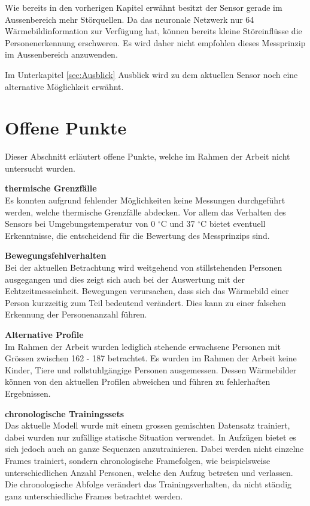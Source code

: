 Wie bereits in den vorherigen Kapitel erwähnt besitzt der Sensor gerade im Aussenbereich mehr Störquellen. Da das neuronale Netzwerk nur 64 Wärmebildinformation zur Verfügung hat, können bereits kleine Störeinflüsse die Personenerkennung erschweren. Es wird daher nicht empfohlen dieses Messprinzip im Aussenbereich anzuwenden.

Im Unterkapitel \ref{sec:Ausblick} Ausblick  wird zu dem aktuellen Sensor noch eine alternative Möglichkeit erwähnt. 
\newpage

\section{Offene Punkte}
\label{sec:OffenePunkte}
Dieser Abschnitt erläutert offene Punkte, welche im Rahmen der Arbeit nicht untersucht wurden.

\textbf{thermische Grenzfälle}\\
Es konnten aufgrund fehlender Möglichkeiten keine Messungen durchgeführt werden, welche thermische Grenzfälle abdecken. Vor allem das Verhalten des Sensors bei Umgebungstemperatur von 0 $ ^\circ$C und 37 $^\circ$C bietet eventuell Erkenntnisse, die entscheidend für die Bewertung des Messprinzips sind.

\textbf{Bewegungsfehlverhalten}\\
Bei der aktuellen Betrachtung wird weitgehend von stillstehenden Personen ausgegangen und dies zeigt sich auch bei der Auswertung mit der Echtzeitmesseinheit. Bewegungen verursachen, dass sich das Wärmebild einer Person kurzzeitig zum Teil bedeutend verändert. Dies kann zu einer falschen Erkennung der Personenanzahl führen. 

\textbf{Alternative Profile}\\
Im Rahmen der Arbeit wurden lediglich stehende erwachsene Personen mit Grössen zwischen 162 - 187 betrachtet. Es wurden im Rahmen der Arbeit keine Kinder, Tiere und rollstuhlgängige Personen ausgemessen. Dessen Wärmebilder können von den aktuellen Profilen abweichen und führen zu fehlerhaften Ergebnissen.

\textbf{chronologische Trainingssets}\\
Das aktuelle Modell wurde mit einem grossen gemischten Datensatz trainiert, dabei wurden nur zufällige statische Situation verwendet. In Aufzügen bietet es sich jedoch auch an ganze Sequenzen anzutrainieren. Dabei werden nicht einzelne Frames trainiert, sondern chronologische Framefolgen, wie beispielsweise unterschiedlichen Anzahl Personen, welche den Aufzug betreten und verlassen. Die chronologische Abfolge verändert das Trainingsverhalten, da nicht ständig ganz unterschiedliche Frames betrachtet werden.

